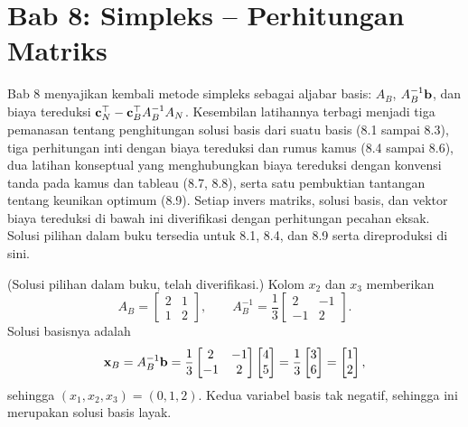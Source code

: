 \section{Bab 8: Simpleks -- Perhitungan Matriks}

Bab 8 menyajikan kembali metode simpleks sebagai aljabar basis: $A_B$,
$A_B^{-1}\mathbf{b}$, dan biaya tereduksi
$\mathbf{c}_N^\top - \mathbf{c}_B^\top A_B^{-1} A_N$. Kesembilan latihannya terbagi menjadi
tiga pemanasan tentang penghitungan solusi basis dari suatu basis (8.1 sampai
8.3), tiga perhitungan inti dengan biaya tereduksi dan rumus kamus (8.4 sampai
8.6), dua latihan konseptual yang menghubungkan biaya tereduksi dengan konvensi
tanda pada kamus dan tableau (8.7, 8.8), serta satu pembuktian tantangan tentang
keunikan optimum (8.9). Setiap invers matriks, solusi basis, dan vektor biaya
tereduksi di bawah ini diverifikasi dengan perhitungan pecahan eksak. Solusi
pilihan dalam buku tersedia untuk 8.1, 8.4, dan 8.9 serta direproduksi di sini.


(Solusi pilihan dalam buku, telah diverifikasi.) Kolom $x_2$ dan $x_3$
memberikan
\[
A_B =
\begin{bmatrix}
2 & 1 \\
1 & 2
\end{bmatrix},
\qquad
A_B^{-1} = \frac{1}{3}
\begin{bmatrix}
2 & -1 \\
-1 & 2
\end{bmatrix}.
\]
Solusi basisnya adalah
\[
\mathbf{x}_B = A_B^{-1}\mathbf{b} = \frac{1}{3}
\begin{bmatrix}
2 & -1 \\
-1 & 2
\end{bmatrix}
\begin{bmatrix}
4 \\ 5
\end{bmatrix}
= \frac{1}{3}
\begin{bmatrix}
3 \\ 6
\end{bmatrix}
=
\begin{bmatrix}
1 \\ 2
\end{bmatrix},
\]
sehingga $(x_1, x_2, x_3) = (0, 1, 2)$. Kedua variabel basis tak negatif,
sehingga ini merupakan solusi basis layak.

